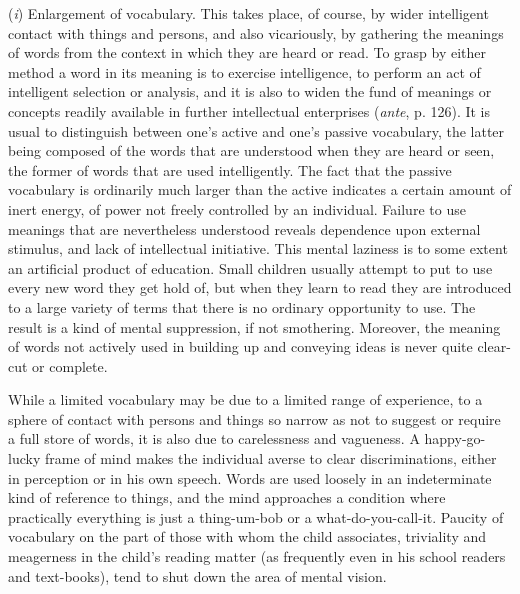 \documentclass[showtrims,ustradepaper]{memoir}
\begin{document}

(\emph{i}) Enlargement of vocabulary. This takes place, of course, by
wider intelligent contact with things and persons, and also vicariously,
by gathering the meanings of words from the context in which they are
heard or read. To grasp by either method a word in its meaning is to
exercise intelligence, to perform an act of intelligent selection or
analysis, and it is also to widen the fund of meanings or concepts
readily available in further intellectual enterprises (\emph{ante}, p.
126). It is usual to distinguish between one's active and one's passive
vocabulary, the latter being composed of the words that are understood
when they are heard or seen, the former of words that are used
intelligently. The fact that the passive vocabulary is ordinarily much
larger than the active indicates a certain amount of inert energy, of
power not freely controlled by an individual. Failure to use meanings
that are nevertheless understood reveals dependence upon external
stimulus, and lack of intellectual initiative. This mental laziness is
to some extent an artificial product of education. Small children
usually attempt to put to use every new word they get hold of, but when
they learn to read they are introduced to a large variety of terms that
there is no ordinary opportunity to
use.
The result is a kind of mental suppression, if not smothering. Moreover,
the meaning of words not actively used in building up and conveying
ideas is never quite clear-cut or complete.


While a limited vocabulary may be due to a limited range of experience,
to a sphere of contact with persons and things so narrow as not to
suggest or require a full store of words, it is also due to carelessness
and vagueness. A happy-go-lucky frame of mind makes the individual
averse to clear discriminations, either in perception or in his own
speech. Words are used loosely in an indeterminate kind of reference to
things, and the mind approaches a condition where practically everything
is just a thing-um-bob or a what-do-you-call-it. Paucity of vocabulary
on the part of those with whom the child associates, triviality and
meagerness in the child's reading matter (as frequently even in his
school readers and text-books), tend to shut down the area of mental
vision.

\end{document}
